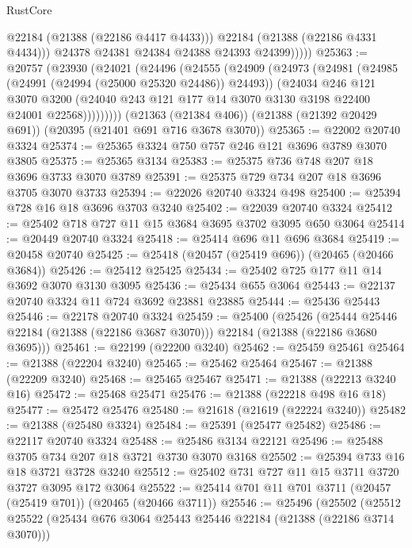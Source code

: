 \begin{lexlean}{RustCore}
\begin{coremodule}
                  @22184
                  (@21388 (@22186 @4417 @4433)))
                @22184
                (@21388 (@22186 @4331 @4434)))
              @24378
              @24381
              @24384
              @24388
              @24393
              @24399)))))
@25363 := @20757
    (@23930
      (@24021
        (@24496
          (@24555
            (@24909
              (@24973
                (@24981
                  (@24985 (@24991 (@24994 (@25000 @25320 @24486)) @24493))
                  (@24034
                    @246
                    @121
                    @3070
                    @3200
                    (@24040 @243 @121 @177 @14 @3070 @3130 @3198 @22400 @24001 @22568)))))))))
    (@21363 (@21384 @406))
    (@21388 (@21392 @20429 @691))
    (@20395 (@21401 @691 @716 @3678 @3070))
@25365 := @22002 @20740 @3324
@25374 := @25365 @3324 @750 @757 @246 @121 @3696 @3789 @3070 @3805
@25375 := @25365 @3134
@25383 := @25375 @736 @748 @207 @18 @3696 @3733 @3070 @3789
@25391 := @25375 @729 @734 @207 @18 @3696 @3705 @3070 @3733
@25394 := @22026 @20740 @3324 @498
@25400 := @25394 @728 @16 @18 @3696 @3703 @3240
@25402 := @22039 @20740 @3324
@25412 := @25402 @718 @727 @11 @15 @3684 @3695 @3702 @3095 @650 @3064
@25414 := @20449 @20740 @3324
@25418 := @25414 @696 @11 @696 @3684
@25419 := @20458 @20740
@25425 := @25418 (@20457 (@25419 @696)) (@20465 (@20466 @3684))
@25426 := @25412 @25425
@25434 := @25402 @725 @177 @11 @14 @3692 @3070 @3130 @3095
@25436 := @25434 @655 @3064
@25443 := @22137 @20740 @3324 @11 @724 @3692 @23881 @23885
@25444 := @25436 @25443
@25446 := @22178 @20740 @3324
@25459 := @25400
    (@25426
      (@25444 @25446 @22184 (@21388 (@22186 @3687 @3070)))
      @22184
      (@21388 (@22186 @3680 @3695)))
@25461 := @22199 (@22200 @3240)
@25462 := @25459 @25461
@25464 := @21388 (@22204 @3240)
@25465 := @25462 @25464
@25467 := @21388 (@22209 @3240)
@25468 := @25465 @25467
@25471 := @21388 (@22213 @3240 @16)
@25472 := @25468 @25471
@25476 := @21388 (@22218 @498 @16 @18)
@25477 := @25472 @25476
@25480 := @21618 (@21619 (@22224 @3240))
@25482 := @21388 (@25480 @3324)
@25484 := @25391 (@25477 @25482)
@25486 := @22117 @20740 @3324
@25488 := @25486 @3134 @22121
@25496 := @25488 @3705 @734 @207 @18 @3721 @3730 @3070 @3168
@25502 := @25394 @733 @16 @18 @3721 @3728 @3240
@25512 := @25402 @731 @727 @11 @15 @3711 @3720 @3727 @3095 @172 @3064
@25522 := @25414 @701 @11 @701 @3711 (@20457 (@25419 @701)) (@20465 (@20466 @3711))
@25546 := @25496
    (@25502
      (@25512
        @25522
        (@25434 @676 @3064 @25443 @25446 @22184 (@21388 (@22186 @3714 @3070)))

\end{coremodule}
\end{lexlean}
